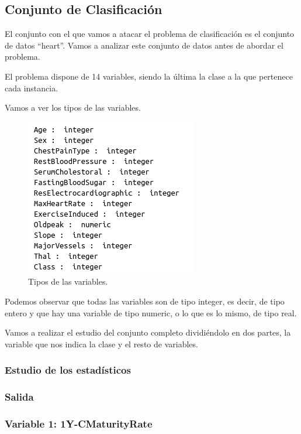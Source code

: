 \documentclass[12pt,a4paper]{article}
\begin{document}
\subsection{Conjunto de Clasificación}

El conjunto con el que vamos a atacar el problema de clasificación es el conjunto de datos ``heart''. Vamos a analizar este conjunto de datos antes de abordar el problema.

El problema dispone de 14 variables, siendo la última la clase a la que pertenece cada instancia.

Vamos a ver los tipos de las variables.

\begin{figure}[H]
	\centering
	\includegraphics[scale=0.7]{./Imagenes/EDA/Clasificacion/tipos_variables.png}
	\caption{Tipos de las variables.}
\end{figure}

Podemos observar que todas las variables son de tipo integer, es decir, de tipo entero y que hay una variable de tipo numeric, o lo que es lo mismo, de tipo real.

Vamos a realizar el estudio del conjunto completo dividiéndolo en dos partes, la variable que nos indica la clase y el resto de variables.

\subsubsection{Estudio de los estadísticos}

\subsubsection*{Salida}



\subsubsection*{Variable 1: 1Y-CMaturityRate}
\end{document}
